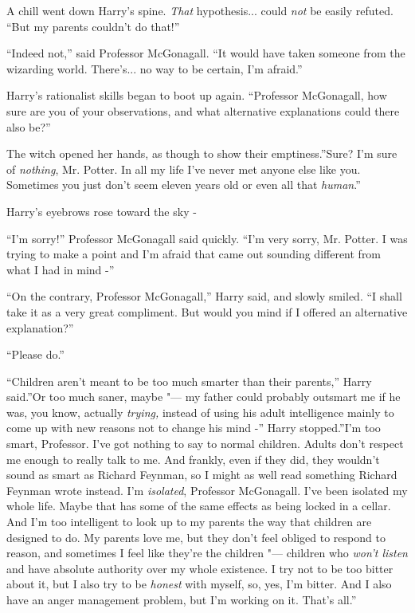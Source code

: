 A chill went down Harry's spine. \emph{That} hypothesis... could
\emph{not} be easily refuted. ``But my parents couldn't do that!''

``Indeed not,'' said Professor McGonagall. ``It would have taken someone
from the wizarding world. There's... no way to be certain, I'm
afraid.''

Harry's rationalist skills began to boot up again. ``Professor
McGonagall, how sure are you of your observations, and what alternative
explanations could there also be?''

The witch opened her hands, as though to show their emptiness.''Sure?
I'm sure of \emph{nothing}, Mr. Potter. In all my life I've never met
anyone else like you. Sometimes you just don't seem eleven years old or
even all that \emph{human}.''

Harry's eyebrows rose toward the sky -

``I'm sorry!'' Professor McGonagall said quickly. ``I'm very sorry, Mr.
Potter. I was trying to make a point and I'm afraid that came out
sounding different from what I had in mind -''

``On the contrary, Professor McGonagall,'' Harry said, and slowly
smiled. ``I shall take it as a very great compliment. But would you mind
if I offered an alternative explanation?''

``Please do.''

``Children aren't meant to be too much smarter than their parents,''
Harry said.''Or too much saner, maybe "--- my father could probably
outsmart me if he was, you know, actually \emph{trying,} instead of
using his adult intelligence mainly to come up with new reasons not to
change his mind -'' Harry stopped.''I'm too smart, Professor. I've got
nothing to say to normal children. Adults don't respect me enough to
really talk to me. And frankly, even if they did, they wouldn't sound as
smart as Richard Feynman, so I might as well read something Richard
Feynman wrote instead. I'm \emph{isolated}, Professor McGonagall. I've
been isolated my whole life. Maybe that has some of the same effects as
being locked in a cellar. And I'm too intelligent to look up to my
parents the way that children are designed to do. My parents love me,
but they don't feel obliged to respond to reason, and sometimes I feel
like they're the children "--- children who \emph{won't listen} and have
absolute authority over my whole existence. I try not to be too bitter
about it, but I also try to be \emph{honest} with myself, so, yes, I'm
bitter. And I also have an anger management problem, but I'm working on
it. That's all.''

